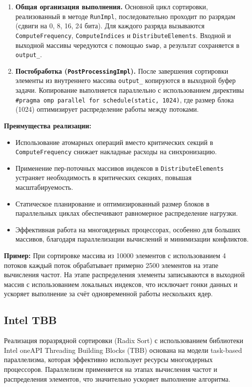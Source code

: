 \documentclass[12pt]{article}
\begin{document}
\begin{enumerate}
  \item \textbf{Общая организация выполнения.}
  Основной цикл сортировки, реализованный в методе \texttt{RunImpl}, последовательно проходит по разрядам (сдвиги на 0, 8, 16, 24 бита). Для каждого разряда вызываются \texttt{ComputeFrequency}, \texttt{ComputeIndices} и \texttt{DistributeElements}. Входной и выходной массивы чередуются с помощью \texttt{swap}, а результат сохраняется в \texttt{output\_}.
  
  \item \textbf{Постобработка (\texttt{PostProcessingImpl}).}
  После завершения сортировки элементы из внутреннего массива \texttt{output\_} копируются в выходной буфер задачи. Копирование выполняется параллельно с использованием директивы \texttt{\#pragma omp parallel for schedule(static, 1024)}, где размер блока (1024) оптимизирует распределение работы между потоками.
\end{enumerate}

\textbf{Преимущества реализации:}
\begin{itemize}
  \item Использование атомарных операций вместо критических секций в \texttt{ComputeFrequency} снижает накладные расходы на синхронизацию.
  \item Применение пер-поточных массивов индексов в \texttt{DistributeElements} устраняет необходимость в критических секциях, повышая масштабируемость.
  \item Статическое планирование и оптимизированный размер блоков в параллельных циклах обеспечивают равномерное распределение нагрузки.
  \item Эффективная работа на многоядерных процессорах, особенно для больших массивов, благодаря параллелизации вычислений и минимизации конфликтов.
\end{itemize}

\textbf{Пример:}
При сортировке массива из 10000 элементов с использованием 4 потоков каждый поток обрабатывает примерно 2500 элементов на этапе вычисления частот. На этапе распределения элементы записываются в выходной массив с использованием локальных индексов, что исключает гонки данных и ускоряет выполнение за счёт одновременной работы нескольких ядер.

\subsection{Intel TBB}

Реализация поразрядной сортировки (Radix Sort) с использованием библиотеки Intel oneAPI Threading Building Blocks (TBB) основана на модели task-based параллелизма, которая эффективно использует ресурсы многоядерных процессоров. Параллелизм применяется на этапах вычисления частот и распределения элементов, что значительно ускоряет выполнение алгоритма.
\end{document}
